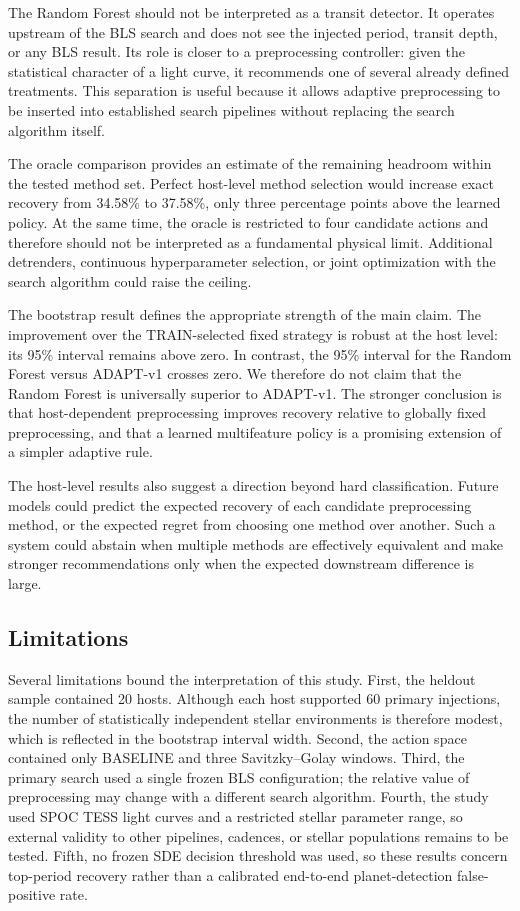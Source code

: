 \documentclass[10pt,twocolumn]{article}
\begin{document}
The Random Forest should not be interpreted as a transit detector. It operates upstream of the BLS search and does not see the injected period, transit depth, or any BLS result. Its role is closer to a preprocessing controller: given the statistical character of a light curve, it recommends one of several already defined treatments. This separation is useful because it allows adaptive preprocessing to be inserted into established search pipelines without replacing the search algorithm itself.

The oracle comparison provides an estimate of the remaining headroom within the tested method set. Perfect host-level method selection would increase exact recovery from 34.58\% to 37.58\%, only three percentage points above the learned policy. At the same time, the oracle is restricted to four candidate actions and therefore should not be interpreted as a fundamental physical limit. Additional detrenders, continuous hyperparameter selection, or joint optimization with the search algorithm could raise the ceiling.

The bootstrap result defines the appropriate strength of the main claim. The improvement over the TRAIN-selected fixed strategy is robust at the host level: its 95\% interval remains above zero. In contrast, the 95\% interval for the Random Forest versus ADAPT-v1 crosses zero. We therefore do not claim that the Random Forest is universally superior to ADAPT-v1. The stronger conclusion is that host-dependent preprocessing improves recovery relative to globally fixed preprocessing, and that a learned multifeature policy is a promising extension of a simpler adaptive rule.

The host-level results also suggest a direction beyond hard classification. Future models could predict the expected recovery of each candidate preprocessing method, or the expected regret from choosing one method over another. Such a system could abstain when multiple methods are effectively equivalent and make stronger recommendations only when the expected downstream difference is large.

\subsection{Limitations}

Several limitations bound the interpretation of this study. First, the heldout sample contained 20 hosts. Although each host supported 60 primary injections, the number of statistically independent stellar environments is therefore modest, which is reflected in the bootstrap interval width. Second, the action space contained only BASELINE and three Savitzky--Golay windows. Third, the primary search used a single frozen BLS configuration; the relative value of preprocessing may change with a different search algorithm. Fourth, the study used SPOC TESS light curves and a restricted stellar parameter range, so external validity to other pipelines, cadences, or stellar populations remains to be tested. Fifth, no frozen SDE decision threshold was used, so these results concern top-period recovery rather than a calibrated end-to-end planet-detection false-positive rate.
\end{document}
